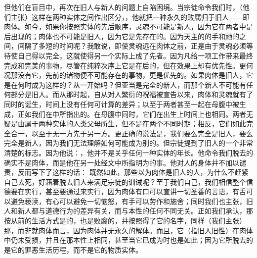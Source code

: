 但他们在盲目中，再次在旧人与新人的问题上自陷困境。当宗徒命令我们时，（他们主张）这样在两种实体之间作出区分，，他就把一种永久的败腐归于旧人——即肉体。如今，如果你按照实体的先后顺序，灵魂不可能是新人，因为它在两者中是后出现的；肉体也不可能是旧人，因为它是先存在的。因为天主的的手和祂的之间，间隔了多短的时间呢？我敢说，即使灵魂远在肉体之前，正是由于灵魂必须等待使自己得以完全，这就使得另一个实际上成了先者。因为凡给一项工作带来最终完成和完美的事物，尽管在纯粹次序上它是在后的，但在效果上却有优先性。更何况那没有它，先前的诸物便不可能存在的事物，更是优先的。如果肉体是旧人，它是在何时成为这样的？从一开始吗？但亚当是完全的新人，而那个新人不可能有任何部分是旧人。而从那时起，自从对人繁衍的祝福被宣告以来，肉体和灵魂就有了同时的诞生，时间上没有任何可计算的差异；以至于两者甚至一起在母腹中被生成，正如我们在中所指出的。在母腹中同时，它们在出生上时间上也相同。两者无疑是由属于两种实体的人类父母所生，但不是在两个不同时期；相反，它们如此完全合一，以至于无一方先于另一方。更正确的说法是，我们要么完全是旧人，要么完全是新人，因为我们无法理解如何可能成为别的。但宗徒提到了旧人的一个非常清楚的标志。因为他说：，他并不是关乎任何一种实体的年长。他命令我们脱去的确实不是肉体，而是他在另一处经文中所指明为的事。他对人的身体并不加以谴责，反而写下了这样的话： 既然如此，那些以为肉体是旧人的人，为什么不赶紧自己去死，好藉着脱去旧人来满足宗徒的训诫呢？至于我们自己，我们相信整个信德要在实行，甚至要通过来实行，因为肉体有口可以宣讲一切圣善的言语，有舌可以避免亵渎，有心可以避免一切恼怒，有手可以劳作和施舍；同时我们也主张，旧人和新人都与道德行为的差异有关，而与本性的任何不同无关。正如我们承认，那按从前的生活方式是的，也是败腐的，并按照得了它的名字，同样（我们主张）那，而非就肉体而言，因为肉体并无永久的解体。而且，它（指旧人旧性）在肉体中仍未受损，并且在那本性上相同，甚至当它已成为时也是如此；因为它所脱去的是它的罪恶生活历程，而不是它的物质实体。\par

